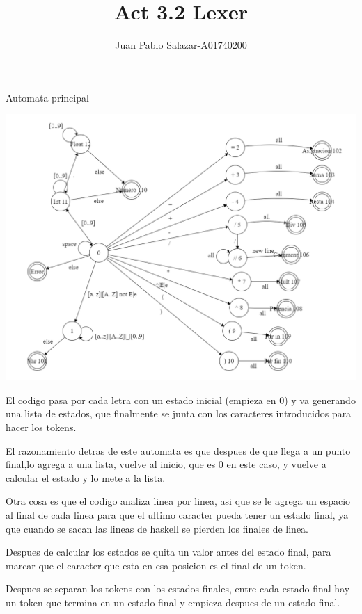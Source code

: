 \documentclass{jhwhw}
\newcommand{\mytitle}{Act 3.2 Lexer}
\begin{document}
\author{Juan Pablo Salazar-A01740200}
\title{\mytitle}

\maketitle
\begin{center}
    Automata principal
\end{center}
\includegraphics[width = \textwidth]{Act3-2imgs/Automata.png}

\bigskip

El codigo pasa por cada letra con un estado inicial (empieza en 0) y va generando una lista de estados, que finalmente se junta con los caracteres introducidos para hacer los tokens.

\bigskip
El razonamiento detras de este automata es que despues de que llega a un punto final,lo agrega a una lista, vuelve al inicio, que es 0 en este caso, y vuelve a calcular el estado y lo mete a la lista.

\bigskip

Otra cosa es que el codigo analiza linea por linea, asi que se le agrega un espacio al final de cada linea para que el ultimo caracter pueda tener un estado final, ya que cuando se sacan las lineas de haskell se pierden los finales de linea.

Despues de calcular los estados se quita un valor antes del estado final, para marcar que el caracter que esta en esa posicion es el final de un token.

Despues se separan los tokens con los estados finales, entre cada estado final hay un token que termina en un estado final y empieza despues de un estado final.
\end{document}
